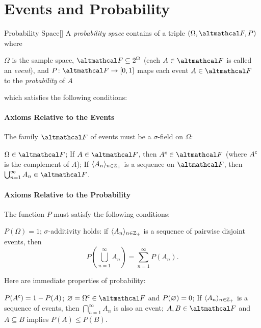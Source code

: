 \documentclass[../complex_variables_1.tex]{subfiles}
\begin{document}
\section{Events and Probability}

\begin{Definition}{Probability Space}[]
    A \emph{probability space} contains of a triple \((\Omega, \mcal{F}, P)\)
    where
    \begin{itemize}
        \ii
        \(\Omega\) is the sample space,
        \ii
        \(\mcal{F} \subseteq 2^{\Omega}\) (each \(A \in \mcal{F}\) is called an \emph{event}), and
        \ii
        \(P \colon \mcal{F} \to [0, 1]\) maps each event \(A \in \mcal{F}\) to the \emph{probability} of \(A\)
    \end{itemize}
    which satisfies the following conditions:
    \paragraph*{Axioms Relative to the Events}
    The family \(\mcal{F}\) of events must be a \(\sigma\)-field on \(\Omega\):
    \begin{enumerate}[label=(\arabic*)]
        \ii \(\Omega \in \mcal{F}\);
        \ii If \(A \in \mcal{F}\), then \(A^\cmpl \in \mcal{F}\) (where \(A^{\mathsf{c}}\) is the complement
        of \(A\));
        \ii If \(\lang A_n \rang_{n \in \ZZ_+}\) is a sequence on \(\mcal{F}\),
        then \(\bigcup_{n=1}^\infty A_n \in \mcal{F}\).
    \end{enumerate}
    \paragraph*{Axioms Relative to the Probability}
    The function \(P\) must satisfy the following conditions:
    \begin{enumerate}[label=(\arabic*)]
        \ii \(P(\Omega) = 1\);
        \ii \(\sigma\)-additivity holds: if \(\lang A_n \rang_{n \in \ZZ_+}\) is a sequence of
        pairwise disjoint events, then
        \[
            P\left( \bigcup_{n=1}^\infty A_n \right) = \sum_{n=1}^\infty P(A_n).
        \]
    \end{enumerate}
\end{Definition}

\begin{note}
    Here are immediate properties of probability:
    \begin{itemize}
        \ii \(P(A^{\mathsf{c}}) = 1 - P(A)\);
        \ii \(\OO = \Omega^\cmpl \in \mcal{F}\) and \(P(\varnothing) = 0\);
        \ii If \(\lang A_n \rang_{n \in \ZZ_+}\) is a sequence of events, then
        \(\bigcap_{n=1}^\infty A_n\) is also an event;
        \ii \(A, B \in \mcal{F}\) and \(A \subseteq B\) implies \(P(A) \le P(B)\).
    \end{itemize}
\end{note}
\end{document}
